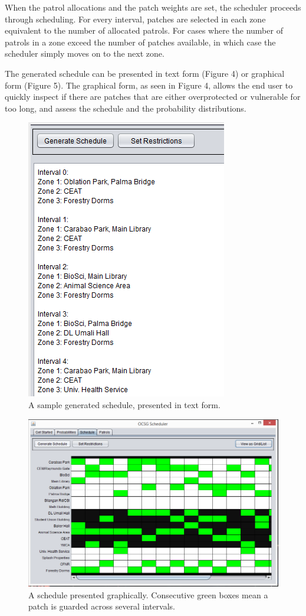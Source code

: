 \documentclass[journal]{./IEEE/IEEEtran}
\begin{document}
When the patrol allocations and the patch weights are set, the scheduler proceeds through scheduling. For every interval, patches are selected in each zone equivalent to the number of allocated patrols. For cases where the number of patrols in a zone exceed the number of patches available, in which case the scheduler simply moves on to the next zone.

The generated schedule can be presented in text form (Figure 4) or graphical form (Figure 5). The graphical form, as seen in Figure 4, allows the end user to quickly inspect if there are patches that are either overprotected or vulnerable for too long, and assess the schedule and the probability distributions.

\begin{figure}[h]
\centering
\includegraphics[scale=0.5]{./Images/schedulePanel.png}
\caption{A sample generated schedule, presented in text form.}
\end{figure}

\begin{figure}[h]
\centering
\includegraphics[scale=0.3]{./Images/ScheduleVisuals.png}
\caption{A schedule presented graphically. Consecutive green boxes mean a patch is guarded across several intervals.}
\end{figure}
\end{document}
